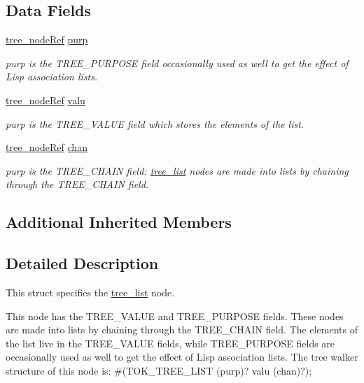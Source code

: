 \subsection*{Data Fields}
\begin{DoxyCompactItemize}
\item 
\hyperlink{tree__node_8hpp_a6ee377554d1c4871ad66a337eaa67fd5}{tree\+\_\+node\+Ref} \hyperlink{structtree__list_a4c23410c67dcffd87d3269dc7f1af65c}{purp}
\begin{DoxyCompactList}\small\item\em purp is the T\+R\+E\+E\+\_\+\+P\+U\+R\+P\+O\+SE field occasionally used as well to get the effect of Lisp association lists. \end{DoxyCompactList}\item 
\hyperlink{tree__node_8hpp_a6ee377554d1c4871ad66a337eaa67fd5}{tree\+\_\+node\+Ref} \hyperlink{structtree__list_a37306ae6413650f862fa00a374bef2ce}{valu}
\begin{DoxyCompactList}\small\item\em purp is the T\+R\+E\+E\+\_\+\+V\+A\+L\+UE field which stores the elements of the list. \end{DoxyCompactList}\item 
\hyperlink{tree__node_8hpp_a6ee377554d1c4871ad66a337eaa67fd5}{tree\+\_\+node\+Ref} \hyperlink{structtree__list_aa5ce539dab8623b7ff811a2fbd1f0f25}{chan}
\begin{DoxyCompactList}\small\item\em purp is the T\+R\+E\+E\+\_\+\+C\+H\+A\+IN field\+: \hyperlink{structtree__list}{tree\+\_\+list} nodes are made into lists by chaining through the T\+R\+E\+E\+\_\+\+C\+H\+A\+IN field. \end{DoxyCompactList}\end{DoxyCompactItemize}
\subsection*{Additional Inherited Members}


\subsection{Detailed Description}
This struct specifies the \hyperlink{structtree__list}{tree\+\_\+list} node. 

This node has the T\+R\+E\+E\+\_\+\+V\+A\+L\+UE and T\+R\+E\+E\+\_\+\+P\+U\+R\+P\+O\+SE fields. These nodes are made into lists by chaining through the T\+R\+E\+E\+\_\+\+C\+H\+A\+IN field. The elements of the list live in the T\+R\+E\+E\+\_\+\+V\+A\+L\+UE fields, while T\+R\+E\+E\+\_\+\+P\+U\+R\+P\+O\+SE fields are occasionally used as well to get the effect of Lisp association lists. The tree walker structure of this node is\+: \#(T\+O\+K\+\_\+\+T\+R\+E\+E\+\_\+\+L\+I\+ST (purp)? valu (chan)?); 

